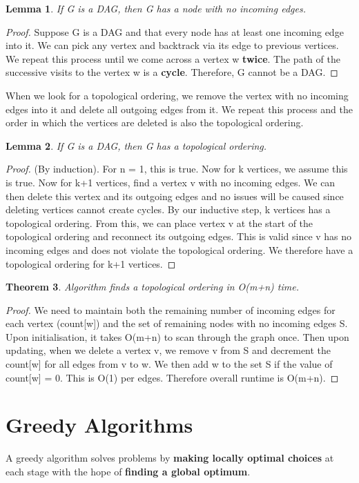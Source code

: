 \documentclass[11pt, oneside]{article}
\newtheorem{theorem}{Theorem}
\newtheorem{lemma}[theorem]{Lemma}
\theoremstyle{definition}
\begin{document}
\begin{lemma}
  If G is a DAG, then G has a node with no incoming edges.
\end{lemma}
\begin{proof}
  Suppose G is a DAG and that every node has at least one incoming edge into it. We can pick any vertex and backtrack via its edge to previous vertices. We repeat this process until we come across a vertex w \textbf{twice}. The path of the successive visits to the vertex w is a \textbf{cycle}. Therefore, G cannot be a DAG.
\end{proof}

When we look for a topological ordering, we remove the vertex with no incoming edges into it and delete all outgoing edges from it. We repeat this process and the order in which the vertices are deleted is also the topological ordering.

\begin{lemma}
  If G is a DAG, then G has a topological ordering.
\end{lemma}
\begin{proof}
  (By induction). For n = 1, this is true. Now for k vertices, we assume this is true. Now for k+1 vertices, find a vertex v with no incoming edges. We can then delete this vertex and its outgoing edges and no issues will be caused since deleting vertices cannot create cycles. By our inductive step, k vertices has a topological ordering. From this, we can place vertex v at the start of the topological ordering and reconnect its outgoing edges. This is valid since v has no incoming edges and does not violate the topological ordering. We therefore have a topological ordering for k+1 vertices.
\end{proof}
\begin{theorem}
  Algorithm finds a topological ordering in O(m+n) time.
\end{theorem}
\begin{proof}
  We need to maintain both the remaining number of incoming edges for each vertex (count[w]) and the set of remaining nodes with no incoming edges S. Upon initialisation, it takes O(m+n) to scan through the graph once. Then upon updating, when we delete a vertex v, we remove v from S and decrement the count[w] for all edges from v to w. We then add w to the set S if the value of count[w] = 0. This is O(1) per edges. Therefore overall runtime is O(m+n).
\end{proof}
\newpage
\section{Greedy Algorithms}
A greedy algorithm solves problems by \textbf{making locally optimal choices} at each stage with the hope of \textbf{finding a global optimum}.
\end{document}
